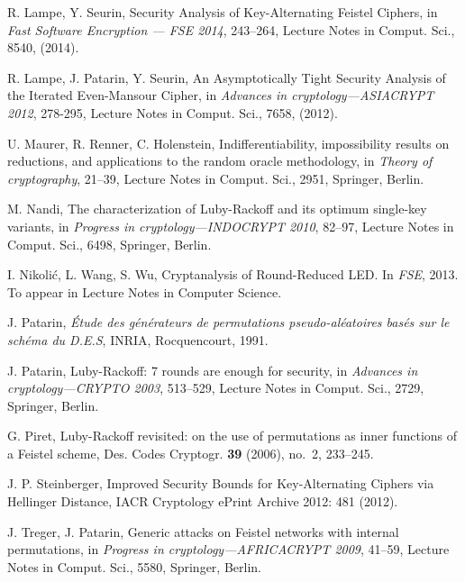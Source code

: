 \documentclass{llncs}
\begin{document}
\begin{thebibliography}{99}
R. Lampe, Y. Seurin, 
Security Analysis of Key-Alternating Feistel Ciphers,
in {\it Fast Software Encryption --- FSE 2014}, 243--264, Lecture Notes in Comput. Sci., 8540, (2014).

R. Lampe, J. Patarin, Y. Seurin, An Asymptotically Tight Security Analysis of the Iterated Even-Mansour
Cipher, in {\it Advances in cryptology---ASIACRYPT 2012}, 278-295, Lecture Notes in Comput. Sci., 7658, (2012).

U. Maurer, R. Renner, C. Holenstein, Indifferentiability, impossibility results on reductions, and applications to the random oracle methodology, in {\it Theory of cryptography}, 21--39, Lecture Notes in Comput. Sci., 2951, Springer, Berlin.

M. Nandi, The characterization of Luby-Rackoff and its optimum single-key variants, in {\it Progress in cryptology---INDOCRYPT 2010}, 82--97, Lecture Notes in Comput. Sci., 6498, Springer, Berlin.

I. Nikoli{\'c}, L. Wang, S. Wu, Cryptanalysis of Round-Reduced LED. In {\it FSE}, 2013. To appear in Lecture Notes in Computer Science.

J. Patarin, {\it \'Etude des g\'en\'erateurs de permutations pseudo-al\'eatoires bas\'es sur le sch\'ema du D.E.S}, INRIA, Rocquencourt, 1991.

J. Patarin, Luby-Rackoff: 7 rounds are enough for  security, in {\it Advances in cryptology---CRYPTO 2003}, 513--529, Lecture Notes in Comput. Sci., 2729, Springer, Berlin.

G. Piret, Luby-Rackoff revisited: on the use of permutations as inner functions of a Feistel scheme, Des. Codes Cryptogr. {\bf 39} (2006), no.~2, 233--245.

J. P. Steinberger,
Improved Security Bounds for Key-Alternating Ciphers via Hellinger Distance,
IACR Cryptology ePrint Archive 2012: 481 (2012).

J. Treger, J. Patarin, Generic attacks on Feistel networks with internal permutations, in {\it Progress in cryptology---AFRICACRYPT 2009}, 41--59, Lecture Notes in Comput. Sci., 5580, Springer, Berlin. 


\end{thebibliography}
\end{document}
